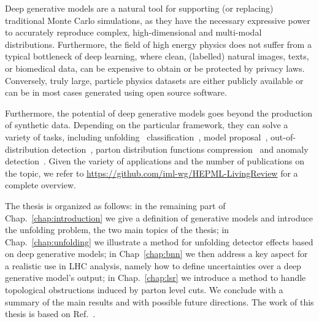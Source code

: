 Deep generative models are a natural tool for supporting  (or replacing) traditional Monte Carlo simulations, as they have the necessary expressive power to accurately reproduce complex, high-dimensional and multi-modal distributions. Furthermore, the field of high energy physics does not suffer from a typical bottleneck of deep learning, where clean, (labelled) natural images, texts, or biomedical data, can be expensive to obtain or be protected by privacy laws. Conversely, truly large, particle physics datasets are either publicly available or can be in most cases generated using open source software.

Furthermore, the potential of deep generative models goes beyond the production of synthetic data. Depending on the particular framework, they can solve a variety of tasks, including unfolding~\cite{Andreassen:2019cjw, Datta:2018mwd,fcgan} classification~\cite{ardizzone2021training, mackowiak2020generative}, model proposal~\cite{2020ganEFT}, out-of-distribution detection~\cite{nalisnick2019deep, kirichenko2020normalizing, serra2020input, song2019unsupervised}, parton distribution functions compression~\cite{compressing_pdf} and anomaly detection~\cite{knapp2020adversarially, pol2020anomaly, cheng2021variational, newPhysAnom}. 
Given the variety of applications and the number of publications on the topic, we refer to \href{https://github.com/iml-wg/HEPML-LivingReview}{https://github.com/iml-wg/HEPML-LivingReview} for a complete overview.

The thesis is organized as follows:
in the remaining part of Chap.~\ref{chap:introduction} we give a definition of generative models and introduce the unfolding problem, the two main topics of the thesis; in Chap.~\ref{chap:unfolding} we illustrate a method for unfolding detector effects based on deep generative models; in Chap~\ref{chap:bnn} we then address a key aspect for a realistic use in LHC analysis, namely how to define uncertainties over a deep generative model's output; in Chap.~\ref{chap:lsr} we introduce a method to handle topological obstructions induced by parton level cuts. We conclude with a summary of the main results and with possible future directions.
The work of this thesis is based on Ref.~\cite{cond_gan, Bellagente:2020piv, Bellagente:2021yyh, LSR}.

